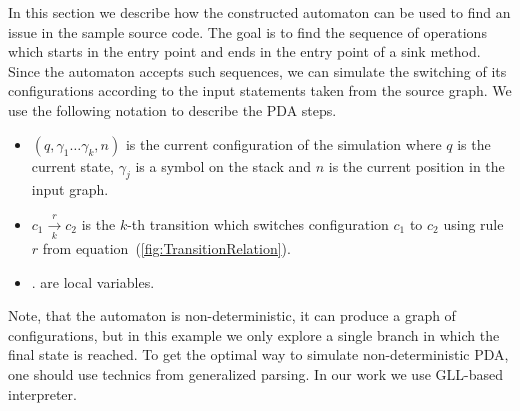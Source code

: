 In this section we describe how the constructed automaton can be used to find an issue in the sample source code.
The goal is to find the sequence of operations which starts in the entry point and ends in the entry point of a sink method.
Since the automaton accepts such sequences, we can simulate the switching of its configurations according to the input statements taken from the source graph.
We use the following notation to describe the PDA steps.
\begin{itemize}
\item $(q, \gamma_1 \ldots \gamma_k, n)$ is the current configuration of the simulation where $q$ is the current state, $\gamma_j$ is a symbol on the stack and $n$ is the current position in the input graph.
\item $c_1 \xrightarrow[k]{r} c_2$ is the $k$-th transition which switches configuration $c_1$ to $c_2$ using rule $r$ from equation~(\ref{fig:TransitionRelation}).
\item {}. are local variables.
\end{itemize}
Note, that the automaton is non-deterministic, it can produce a graph of configurations, but in this example we only explore a single branch in which the final state is reached.
To get the optimal way to simulate non-deterministic PDA, one should use technics from generalized parsing. 
In our work we use GLL-based~\cite{scott2010gll, GrigorevR16} interpreter.

